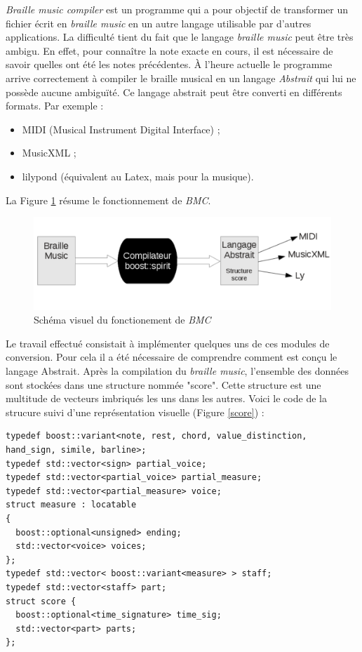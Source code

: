 
\textit{Braille music compiler} est un programme qui a pour objectif
de transformer un fichier écrit en \textit{braille music} en un autre
langage utilisable par d'autres applications. La difficulté tient du fait que le
langage \textit{braille music} peut être très ambigu. En effet,
pour connaître la note exacte en cours, il est nécessaire
de savoir quelles ont été les notes précédentes. \`A l'heure actuelle
le programme arrive correctement à compiler le braille
  musical en un langage \textit{Abstrait} qui lui ne possède aucune
ambiguïté. Ce langage abstrait peut être converti en différents formats. Par exemple :

\begin{itemize}
\item MIDI (Musical Instrument Digital Interface) ;
\item MusicXML ;
\item lilypond (équivalent au Latex, mais pour la musique).
\end{itemize}
La Figure \ref{compiler} résume le fonctionnement de \textit{BMC}.

\begin{figure}[!h]
  \centering
  \includegraphics[width=1\textwidth]{images/fonction-bmc.png}
  \caption{Schéma visuel du fonctionement de \textit{BMC}}
  \label{compiler}
\end{figure}

Le travail effectué consistait à implémenter quelques uns de ces modules de
conversion. Pour cela il a été nécessaire de comprendre comment est
conçu le langage Abstrait. Après la compilation du \textit{braille
  music}, l'ensemble des données sont stockées dans une structure
nommée "score". Cette structure est une multitude de vecteurs
imbriqués les uns dans les autres. Voici le code de la strucure suivi
d'une représentation visuelle (Figure \ref{score}) :

\begin{verbatim}
typedef boost::variant<note, rest, chord, value_distinction, hand_sign, simile, barline>;
typedef std::vector<sign> partial_voice;
typedef std::vector<partial_voice> partial_measure;
typedef std::vector<partial_measure> voice;
struct measure : locatable
{
  boost::optional<unsigned> ending;
  std::vector<voice> voices;
};
typedef std::vector< boost::variant<measure> > staff;
typedef std::vector<staff> part;
struct score {
  boost::optional<time_signature> time_sig;
  std::vector<part> parts;
};
\end{verbatim}

